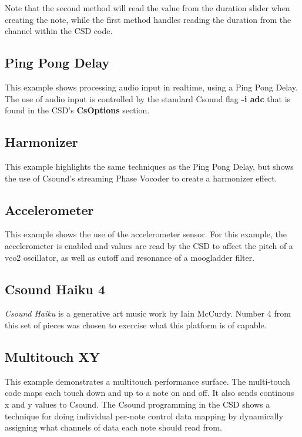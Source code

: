\documentclass[11pt]{article}
\begin{document}
Note that the second method will read the value from the duration slider when creating the note, while the first method handles reading the duration from the channel within the CSD code. 

\subsection{Ping Pong Delay}

This example shows processing audio input in realtime, using a Ping Pong Delay. The use of audio input is controlled by the standard Csound flag \textbf{-i adc} that is found in the CSD's \textbf{CsOptions} section.  


\subsection{Harmonizer}

This example highlights the same techniques as the Ping Pong Delay, but shows the use of Csound's streaming Phase Vocoder to create a harmonizer effect. 

\subsection{Accelerometer}

This example shows the use of the accelerometer sensor.  For this example, the accelerometer is enabled and values are read by the CSD to affect the pitch of a vco2 oscillator, as well as cutoff and resonance of a moogladder filter. 

\subsection{Csound Haiku 4}

\emph{Csound Haiku} is a generative art music work by Iain McCurdy.  Number 4 from this set of pieces was chosen to exercise what this platform is of capable.

\subsection{Multitouch XY}

This example demonstrates a multitouch performance surface. The multi-touch code maps each touch down and up to a note on and off.  It also sends continous x and y values to Csound.  The Csound programming in the CSD shows a technique for doing individual per-note control data mapping by dynamically assigning what channels of data each note should read from. 
\end{document}
